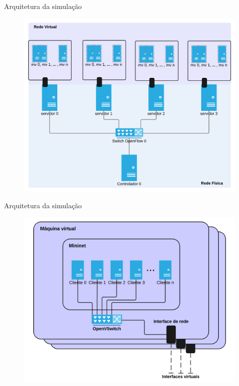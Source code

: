 \begin{frame}{Arquitetura da simulação}

    \begin{figure}[!htb]
        \centering
        \includegraphics[scale=.55]{images/physical-vs-virtual-network-pt}
    \end{figure}

\end{frame}


\begin{frame}{Arquitetura da simulação}

    \begin{figure}[!htb]
        \centering
        \includegraphics[scale=.55]{images/mininet-vm-architecture}
    \end{figure}

\end{frame}


